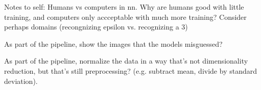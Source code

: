 Notes to self: Humans vs computers in \gls{nn}. Why are humans good with little training, and computers only accceptable with much more training? Consider perhaps domains (recongnizing epsilon vs. recognizing a 3)

As part of the pipeline, show the images that the models misguessed?

As part of the pipeline, normalize the data in a way that's not dimensionality reduction, but that's still preprocessing? (e.g. subtract mean, divide by standard deviation).

